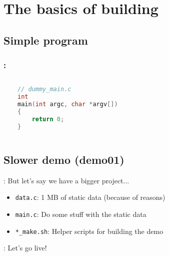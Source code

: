 \section{The basics of building}

\subsection{Simple program}
\begin{frame}[fragile]
    \frametitle{\secname: \small\subsecname\normalsize}
    \begin{columns}

         \\~\\

         \\~\\


        \small
        \begin{lstlisting}[language=C]
// dummy_main.c
int
main(int argc, char *argv[])
{
    return 0;
}
        \end{lstlisting}
        \normalsize

    \end{columns}
\end{frame}

\subsection{Slower demo (demo01)}
\begin{frame}{\secname: \small\subsecname\normalsize}
    But let's say we have a bigger project... \pause

    \begin{itemize}
        \item \texttt{data.c}: 1 MB of static data (because of reasons)
        \item \texttt{main.c}: Do some stuff with the static data
        \item \texttt{*\_make.sh}: Helper scripts for building the demo
    \end{itemize}
\end{frame}

\begin{frame}{\secname: \small\subsecname\normalsize}
    Let's go live!

\end{frame}


